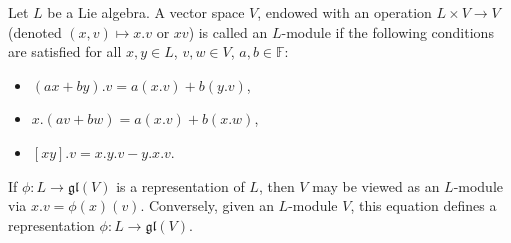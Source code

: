 Let $L$ be a Lie algebra. A vector space $V$, endowed with an operation $L \times V \rightarrow V$ (denoted $(x, v) \mapsto x.v$ or $xv$) is called an $L$-module if the following conditions are satisfied for all $x, y \in L$, $v, w \in V$, $a, b \in \mathbb{F}$:

\begin{itemize}
\item[(M1)] $(ax + by).v = a(x.v) + b(y.v)$,
\item[(M2)] $x.(av + bw) = a(x.v) + b(x.w)$,
\item[(M3)] $[xy].v = x.y.v - y.x.v$.
\end{itemize}

If $\phi: L \rightarrow \mathfrak{gl}(V)$ is a representation of $L$, then $V$ may be viewed as an $L$-module via $x.v = \phi(x)(v)$. Conversely, given an $L$-module $V$, this equation defines a representation $\phi: L \rightarrow \mathfrak{gl}(V)$.
